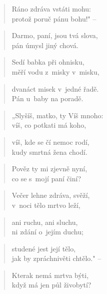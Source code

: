 \begin{verse}
Ráno zdráva vstáti mohu: \\
protož poruč pánu bohu!" --
\end{verse}

\begin{verse}
Darmo, paní, jsou tvá slova, \\
pán úmysl jiný chová.
\end{verse}

\begin{verse}
Sedí babka při ohnisku, \\
měří vodu z~misky v~misku,
\end{verse}

\begin{verse}
dvanáct misek v~jedné řadě. \\
Pán u~baby na poradě.
\end{verse}

\begin{verse}
„Slyšíš, matko, ty Víš mnoho: \\
víš, co potkati má koho,
\end{verse}

\begin{verse}
víš, kde se čí nemoc rodí, \\
kudy smrtná žena chodí.
\end{verse}

\begin{verse}
Pověz ty mi zjevně nyní, \\
co se s~mojí paní činí?
\end{verse}

\begin{verse}
Večer lehne zdráva, svěží, \\
v~noci tělo mrtvo leží,
\end{verse}

\begin{verse}
ani ruchu, ani sluchu, \\
ni zdání o~jejím duchu;
\end{verse}

\begin{verse}
studené jest její tělo, \\
jak by zpráchnivěti chtělo." --
\end{verse}

\begin{verse}
Kterak nemá mrtva býti, \\
když má jen půl živobytí?
\end{verse}

